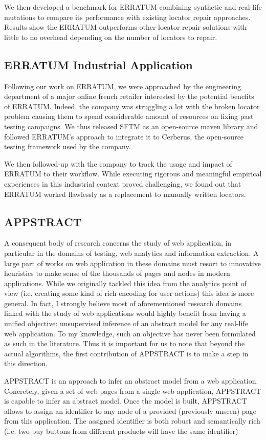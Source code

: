 We then developed a benchmark for ERRATUM combining synthetic and real-life mutations to compare its performance with existing locator repair approaches. Results show the ERRATUM outperforms other locator repair solutions with little to no overhead depending on the number of locators to repair.

\subsection{ERRATUM Industrial Application}
Following our work on ERRATUM, we were approached by the engineering department of a major online french retailer interested by the potential benefits of ERRATUM. Indeed, the company was struggling a lot with the broken locator problem causing them to spend considerable amount of resources on fixing past testing campaigns.
We thus released SFTM as an open-source maven library and followed ERRATUM's approach to integrate it to Cerberus, the open-source testing framework used by the company.

We then followed-up with the company to track the usage and impact of ERRATUM to their workflow. 
While executing rigorous and meaningful empirical experiences in this industrial context proved challenging, we found out that ERRATUM worked flawlessly as a replacement to manually written locators.

\subsection{APPSTRACT}
A consequent body of research concerns the study of web application, in particular in the domains of testing, web analytics and information extraction. A large part of works on web application in these domains must resort to innovative heuristics to make sense of the thousands of pages and nodes in modern applications.
While we originally tackled this idea from the analytics point of view (i.e. creating some kind of rich encoding for user actions) this idea is more general.
In fact, I strongly believe most of aforementioned research domains linked with the study of web applications would highly benefit from having a unified objective: unsupervised inference of an abstract model for any real-life web application. 
To my knowledge, such an objective has never been formulated as such in the literature.
Thus it is important for us to note that beyond the actual algorithms, the first contribution of APPSTRACT is to make a step in this direction.

APPSTRACT is an approach to infer an abstract model from a web application.
Concretely, given a set of web pages from a single web application, APPSTRACT is capable to infer an abstract model. Once the model is built, APPSTRACT allows to assign an identifier to any node of a provided (previously unseen) page from this application. The assigned identifier is both robust and semantically rich (i.e. two buy buttons from different products will have the same identifier) 

